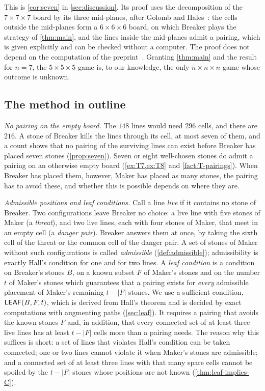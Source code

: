 This is \cref{cor:seven} in \cref{sec:discussion}. Its proof uses the decomposition of the
$7\times7\times7$ board by its three mid-planes, after Golomb and Hales~\cite{GolombHales2002}: the
cells outside the mid-planes form a $6\times6\times6$ board, on which Breaker plays the strategy of
\cref{thm:main}, and the lines inside the mid-planes admit a pairing, which is given explicitly and can
be checked without a computer. The proof does not depend on the computation of the
preprint~\cite{CainRaymondKallersjo2025}.
Granting \cref{thm:main} and the result for $n=7$, the $5\times5\times5$ game is, to our knowledge, the
only $n\times n\times n$ game whose outcome is unknown.

\subsection{The method in outline}\label{ssec:intro-method}

\emph{No pairing on the empty board.} The $148$ lines would need $296$ cells, and there are $216$. A
stone of Breaker kills the lines through its cell, at most seven of them, and a count shows that no
pairing of the surviving lines can exist before Breaker has placed seven stones (\cref{prop:seven}).
Seven or eight well-chosen stones do admit a pairing on an otherwise empty board
(\cref{ex:T7,ex:T8} and \cref{fact:T-pairings}). When Breaker has placed them, however, Maker has placed
as many stones, the pairing has to avoid these, and whether this is possible depends on where they are.

\emph{Admissible positions and leaf conditions.} Call a line \emph{live} if it contains no stone of
Breaker. Two configurations leave Breaker no choice: a live line with five stones of Maker (a
\emph{threat}), and two live lines, each with four stones of Maker, that meet in an empty cell (a
\emph{danger pair}). Breaker answers them at once, by
taking the sixth cell of the threat or the common cell of the danger pair. A set of stones of Maker
without such configurations is called \emph{admissible} (\cref{def:admissible}); admissibility is exactly
Hall's condition for one and for two lines. A \emph{leaf condition} is a condition on Breaker's
stones $B$, on a known subset $F$ of Maker's stones and on the number $t$ of Maker's stones which
guarantees that a pairing exists for \emph{every} admissible placement of Maker's remaining $t-|F|$
stones. We use a sufficient condition, $\mathsf{LEAF}(B,F,t)$, which is derived from Hall's theorem and is
decided by exact computations with augmenting paths (\cref{sec:leaf}). It requires a pairing that
avoids the known stones $F$ and, in addition, that every connected set of at least three live lines has
at least $t-|F|$ cells more than a pairing needs. The reason why this suffices is short: a set of lines
that violates Hall's condition can be taken connected; one or two lines cannot violate it when Maker's
stones are admissible; and a connected set of at least three lines with that many spare cells cannot be
spoiled by the $t-|F|$ stones whose positions are not known (\cref{thm:leaf-implies-C}).

